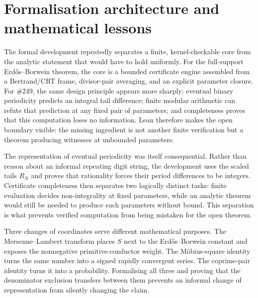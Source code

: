 \documentclass[11pt]{article}
\theoremstyle{definition}
\theoremstyle{remark}
\begin{document}
\section{Formalisation architecture and mathematical lessons}\label{sec:architecture}

The formal development repeatedly separates a finite, kernel-checkable core
from the analytic statement that would have to hold uniformly. For the
full-support Erd\H{o}s--Borwein theorem, the core is a bounded certificate
engine assembled from a Bertrand/CRT frame, divisor-pair averaging, and an
explicit parameter closure. For \#249, the same design principle appears more
sharply: eventual binary periodicity predicts an integral tail difference;
finite modular arithmetic can refute that prediction at any fixed pair of
parameters; and completeness proves that this computation loses no
information. Lean therefore makes the open boundary visible: the missing
ingredient is not another finite verification but a theorem producing
witnesses at unbounded parameters.

The representation of eventual periodicity was itself consequential. Rather
than reason about an informal repeating digit string, the development uses the
scaled tails $R_N$ and proves that rationality forces their period differences
to be integers. Certificate completeness then separates two logically distinct
tasks: finite evaluation decides non-integrality at fixed parameters, while an
analytic theorem would still be needed to produce such parameters without
bound. This separation is what prevents verified computation from being
mistaken for the open theorem.

Three changes of coordinates serve different mathematical purposes. The
Mersenne--Lambert transform places $S$ next to the Erd\H{o}s--Borwein constant
and exposes the nonnegative primitive-conductor weight. The M\"obius-square
identity turns the same number into a signed rapidly convergent series. The
coprime-pair identity turns it into a probability. Formalising all three and
proving that the denominator exclusion transfers between them prevents an
informal change of representation from silently changing the claim.
\end{document}
